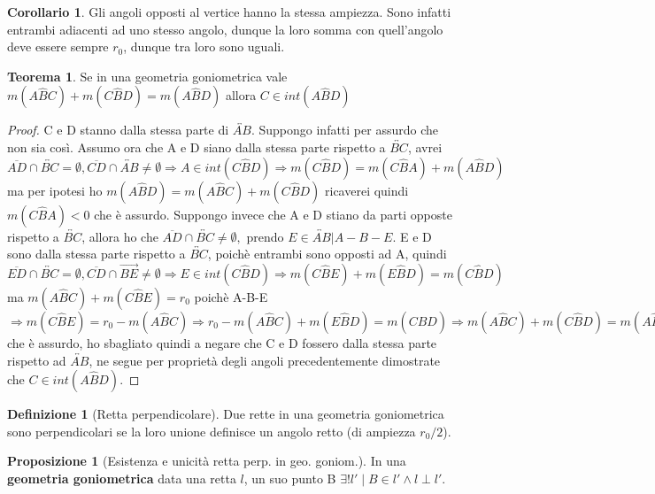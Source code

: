 \documentclass[a4paper,10pt]{article}
\theoremstyle{definition}
\theoremstyle{indentdefinition}
\newtheorem{defn}{Definizione}[section]
\theoremstyle{indentpostulate}
\theoremstyle{indenttheorem}
\newtheorem{thm}{Teorema}[section]
\newtheorem{prop}{Proposizione}[section]
\newtheorem{cor}{Corollario}[section]
\theoremstyle{myremark}
\theoremstyle{indentgeneral}
\begin{document}
\begin{cor}    Gli angoli opposti al vertice hanno la stessa ampiezza. Sono infatti entrambi adiacenti ad uno stesso angolo, dunque la loro somma con quell'angolo deve essere sempre $r_0$, dunque tra loro sono uguali.  \end{cor} 

\begin{thm}   Se in una geometria goniometrica vale $m(A\hat{B}C)+m(C\hat{B}D)=m(A\hat{B}D)$ allora $C \in int(A\hat{B}D)$   \end{thm} 

\begin{proof}  C e D stanno dalla stessa parte di $\overleftrightarrow{AB}$. Suppongo infatti per assurdo che non sia così. Assumo ora che A e D siano dalla stessa parte rispetto a $\overleftrightarrow{BC}$, avrei $\overline{AD} \cap \overleftrightarrow{BC}= \emptyset, \overline{CD} \cap \overleftrightarrow{AB} \neq \emptyset \Rightarrow A \in int(C\hat{B}D) \Rightarrow m(C\hat{B}D)=m(C\hat{B}A)+m(A\hat{B}D)$ ma per ipotesi ho $m(A\hat{B}D)=m(A\hat{B}C)+m(C\hat{B}D)$ ricaverei quindi $m(C\hat{B}A)<0$ che è assurdo. Suppongo invece che A e D stiano da parti opposte rispetto a $\overleftrightarrow{BC}$, allora ho che $\overline{AD} \cap \overleftrightarrow{BC} \neq \emptyset,$ prendo $E \in \overleftrightarrow{AB}|A-B-E.$ E e D sono dalla stessa parte rispetto a $\overleftrightarrow{BC}$, poichè entrambi sono opposti ad A, quindi $\overline{ED} \cap \overleftrightarrow{BC} = \emptyset , \overline{CD} \cap \overrightarrow{BE} \neq \emptyset \Rightarrow E \in int(C \hat{B} D) \Rightarrow m(C\hat{B}E)+m(E\hat{B}D)=m(C\hat{B}D)$ ma $m(A\hat{B}C)+m(C\hat{B}E)=r_0$ poichè A-B-E $\Rightarrow m(C\hat{B}E)=r_0-m(A\hat{B}C)\Rightarrow r_0-m(A\hat{B}C)+m(E\hat{B}D)=m(C\hat{B}D) \Rightarrow m(A\hat{B}C)+m(C\hat{B}D)=m(A\hat{B}D)>r_0$ che è assurdo, ho sbagliato quindi a negare che C e D fossero dalla stessa parte rispetto ad $\overleftrightarrow{AB}$, ne segue per proprietà degli angoli precedentemente dimostrate che $C \in int(A\hat{B}D)$.    \end{proof} 


\begin{defn}[Retta perpendicolare]   Due rette in una geometria goniometrica sono perpendicolari se la loro unione definisce un angolo retto (di ampiezza $r_0/2$).  \end{defn} 

\begin{prop}[Esistenza e unicità retta perp. in geo. goniom.]
    In una \textbf{geometria goniometrica} data una retta $l$, un suo punto B $\exists ! l'\mid B \in l' \land l \perp l'$.  
\end{prop}
\end{document}
